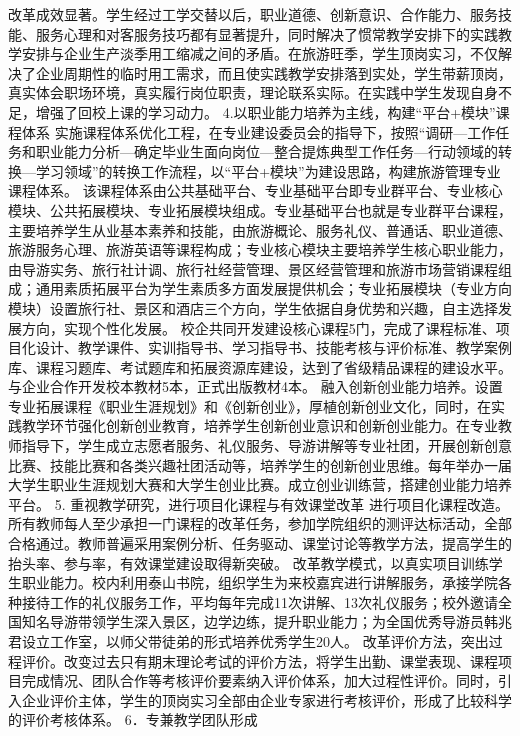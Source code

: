 改革成效显著。学生经过工学交替以后，职业道德、创新意识、合作能力、服务技能、服务心理和对客服务技巧都有显著提升，同时解决了惯常教学安排下的实践教学安排与企业生产淡季用工缩减之间的矛盾。在旅游旺季，学生顶岗实习，不仅解决了企业周期性的临时用工需求，而且使实践教学安排落到实处，学生带薪顶岗，真实体会职场环境，真实履行岗位职责，理论联系实际。在实践中学生发现自身不足，增强了回校上课的学习动力。
4.以职业能力培养为主线，构建“平台+模块”课程体系
实施课程体系优化工程，在专业建设委员会的指导下，按照“调研—工作任务和职业能力分析—确定毕业生面向岗位—整合提炼典型工作任务—行动领域的转换—学习领域”的转换工作流程，以“平台+模块”为建设思路，构建旅游管理专业课程体系。
该课程体系由公共基础平台、专业基础平台即专业群平台、专业核心模块、公共拓展模块、专业拓展模块组成。专业基础平台也就是专业群平台课程，主要培养学生从业基本素养和技能，由旅游概论、服务礼仪、普通话、职业道德、旅游服务心理、旅游英语等课程构成；专业核心模块主要培养学生核心职业能力，由导游实务、旅行社计调、旅行社经营管理、景区经营管理和旅游市场营销课程组成；通用素质拓展平台为学生素质多方面发展提供机会；专业拓展模块（专业方向模块）设置旅行社、景区和酒店三个方向，学生依据自身优势和兴趣，自主选择发展方向，实现个性化发展。
校企共同开发建设核心课程5门，完成了课程标准、项目化设计、教学课件、实训指导书、学习指导书、技能考核与评价标准、教学案例库、课程习题库、考试题库和拓展资源库建设，达到了省级精品课程的建设水平。与企业合作开发校本教材5本，正式出版教材4本。
融入创新创业能力培养。设置专业拓展课程《职业生涯规划》和《创新创业》，厚植创新创业文化，同时，在实践教学环节强化创新创业教育，培养学生创新创业意识和创新创业能力。在专业教师指导下，学生成立志愿者服务、礼仪服务、导游讲解等专业社团，开展创新创意比赛、技能比赛和各类兴趣社团活动等，培养学生的创新创业思维。每年举办一届大学生职业生涯规划大赛和大学生创业比赛。成立创业训练营，搭建创业能力培养平台。
5. 重视教学研究，进行项目化课程与有效课堂改革
进行项目化课程改造。所有教师每人至少承担一门课程的改革任务，参加学院组织的测评达标活动，全部合格通过。教师普遍采用案例分析、任务驱动、课堂讨论等教学方法，提高学生的抬头率、参与率，有效课堂建设取得新突破。
改革教学模式，以真实项目训练学生职业能力。校内利用泰山书院，组织学生为来校嘉宾进行讲解服务，承接学院各种接待工作的礼仪服务工作，平均每年完成11次讲解、13次礼仪服务；校外邀请全国知名导游带领学生深入景区，边学边练，提升职业能力；为全国优秀导游员韩兆君设立工作室，以师父带徒弟的形式培养优秀学生20人。
改革评价方法，突出过程评价。改变过去只有期末理论考试的评价方法，将学生出勤、课堂表现、课程项目完成情况、团队合作等考核评价要素纳入评价体系，加大过程性评价。同时，引入企业评价主体，学生的顶岗实习全部由企业专家进行考核评价，形成了比较科学的评价考核体系。
6．专兼教学团队形成

